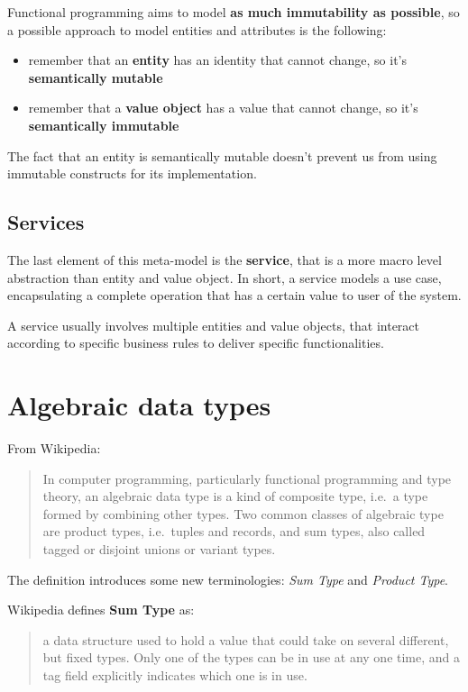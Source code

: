 Functional programming aims to model \textbf{as much immutability as
possible}, so a possible approach to model entities and attributes is
the following:

\begin{itemize}
\itemsep1pt\parskip0pt
\item
  remember that an \textbf{entity} has an identity that cannot change,
  so it's \textbf{semantically mutable}
\item
  remember that a \textbf{value object} has a value that cannot change,
  so it's \textbf{semantically immutable}
\end{itemize}

The fact that an entity is semantically mutable doesn't prevent us from
using immutable constructs for its implementation.

\subsection{Services}\label{services}

The last element of this meta-model is the \textbf{service}, that is a
more macro level abstraction than entity and value object. In short, a
service models a use case, encapsulating a complete operation that has a
certain value to user of the system.

A service usually involves multiple entities and value objects, that
interact according to specific business rules to deliver specific
functionalities.


\section{Algebraic data types}\label{algebraic-data-types}

From Wikipedia:

\begin{quote}
In computer programming, particularly functional programming and type
theory, an algebraic data type is a kind of composite type, i.e.~a type
formed by combining other types. Two common classes of algebraic type
are product types, i.e.~tuples and records, and sum types, also called
tagged or disjoint unions or variant types.
\end{quote}

The definition introduces some new terminologies: \emph{Sum Type} and
\emph{Product Type}.

Wikipedia defines \textbf{Sum Type} as:

\begin{quote}
a data structure used to hold a value that could take on several
different, but fixed types. Only one of the types can be in use at any
one time, and a tag field explicitly indicates which one is in use.
\end{quote}

